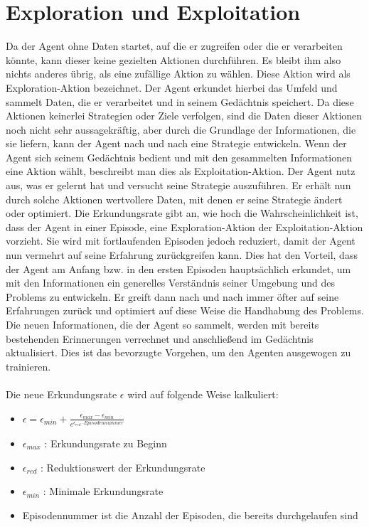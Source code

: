 \documentclass[12pt,titlepage]{article}
\begin{document}
\section{Exploration und Exploitation}
Da der Agent ohne Daten startet, auf die er zugreifen oder die er verarbeiten könnte, kann dieser keine gezielten Aktionen durchführen. Es bleibt ihm also nichts anderes übrig, als eine zufällige Aktion zu wählen. Diese Aktion wird als Exploration-Aktion bezeichnet. Der Agent erkundet hierbei das Umfeld und sammelt Daten, die er verarbeitet und in seinem Gedächtnis speichert. Da diese Aktionen keinerlei Strategien oder Ziele verfolgen, sind die Daten dieser Aktionen noch nicht sehr aussagekräftig, aber durch die Grundlage der Informationen, die sie liefern, kann der Agent nach und nach eine Strategie entwickeln. Wenn der Agent sich seinem Gedächtnis bedient und mit den gesammelten Informationen eine Aktion wählt, beschreibt man dies als Exploitation-Aktion. Der Agent nutz aus, was er gelernt hat und versucht seine Strategie auszuführen. Er erhält nun durch solche Aktionen wertvollere Daten, mit denen er seine Strategie ändert oder optimiert.
Die Erkundungsrate gibt an, wie hoch die Wahrscheinlichkeit ist, dass der Agent in einer Episode, eine Exploration-Aktion der Exploitation-Aktion vorzieht. Sie wird mit fortlaufenden Episoden jedoch reduziert, damit der Agent nun vermehrt auf seine Erfahrung zurückgreifen kann. Dies hat den Vorteil, dass der Agent am Anfang bzw. in den ersten Episoden hauptsächlich erkundet, um mit den Informationen ein generelles Verständnis seiner Umgebung und des Problems zu entwickeln. Er greift dann nach und nach immer öfter auf seine Erfahrungen zurück und optimiert auf diese Weise die Handhabung des Problems. Die neuen Informationen, die der Agent so sammelt, werden mit bereits bestehenden Erinnerungen verrechnet und anschließend im Gedächtnis aktualisiert. Dies ist das bevorzugte Vorgehen, um den Agenten ausgewogen zu trainieren.
\\\\
Die neue Erkundungsrate $\epsilon$ wird auf folgende Weise kalkuliert:
\begin{itemize}
\item $\epsilon = \epsilon_{min} + \frac{\epsilon_{max} - \epsilon_{min}}{e^{\epsilon_{red} \cdot Episodennummer}}$
\item $\epsilon_{max}$ : Erkundungsrate zu Beginn
\item $\epsilon_{red}$ : Reduktionswert der Erkundungsrate
\item $\epsilon_{min}$ : Minimale Erkundungsrate
\item Episodennummer ist die Anzahl der Episoden, die bereits durchgelaufen sind
\end{itemize}
\end{document}
